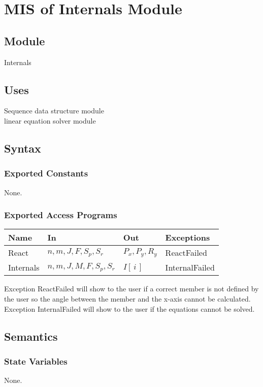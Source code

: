 \documentclass[12pt, titlepage]{article}
\begin{document}
\section{MIS of Internals Module\label{mSpec} }

\subsection{Module}

Internals

\subsection{Uses}

Sequence data structure module\\
linear equation solver module\\



\subsection{Syntax}

\subsubsection{Exported Constants}
None.
\subsubsection{Exported Access Programs}
\begin{center}
\begin{tabular}{p{2cm} p{4cm} p{4cm} p{2cm}}
\hline
\textbf{Name} & \textbf{In} & \textbf{Out} & \textbf{Exceptions} \\
\hline
React & $n,m,J,F,S_p,S_r$  & $P_x,P_y,R_y$& ReactFailed \\
Internals & $n,m,J,M,F,S_p,S_r$  &$I[\,i\,]$ & InternalFailed \\
\hline
\end{tabular}
\end{center}
Exception ReactFailed will show to the user if a correct member is not defined by the user so the angle between the member and the x-axis cannot be calculated. Exception InternalFailed will show to the user if the equations cannot be solved.
\subsection{Semantics}
\subsubsection{State Variables}
None.
\end{document}
